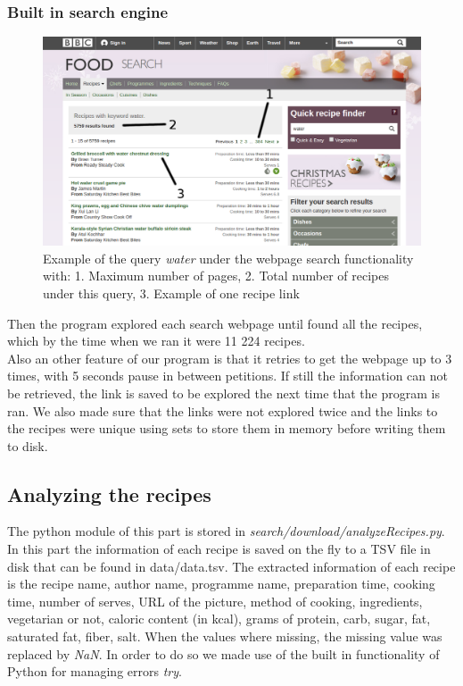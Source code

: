 \documentclass[paper=a4, fontsize=11pt]{scrartcl} %
\numberwithin{equation}{section} %
\numberwithin{figure}{section} %
\numberwithin{table}{section} %
\begin{document}
\subsubsection{Built in search engine}

\begin{figure}[H]
\centering
\includegraphics[width=1\textwidth]{images/search}
\caption{Example of the query \textit{water} under the webpage search functionality with: 1. Maximum number of pages, 2. Total number of recipes under this query, 3. Example of one recipe link}
\end{figure}

Then the program explored each search webpage until found all the recipes, which by the time when we ran it were 11 224 recipes. \\
Also an other feature of our program is that it retries to get the webpage up to 3 times, with 5 seconds pause in between petitions. If still the information can not be retrieved, the link is saved to be explored the next time that the program is ran. We also made sure that the links were not explored twice and the links to the recipes were unique using sets to store them in memory before writing them to disk. 

\subsection{Analyzing the recipes}
The python module of this part is stored in \textit{search/download/analyzeRecipes.py}. In this part the information of each recipe is saved on the fly to a TSV file in disk that can be found in data/data.tsv. The extracted information of each recipe is the recipe name, author name, programme name, preparation time, cooking time, number of serves, URL of the picture, method of cooking, ingredients, vegetarian or not, caloric content (in kcal), grams of protein, carb, sugar, fat, saturated fat, fiber, salt. When the values where missing, the missing value was replaced by \textit{NaN}. In order to do so we made use of the built in functionality of Python for managing errors \textit{try}.
 
\end{document}
